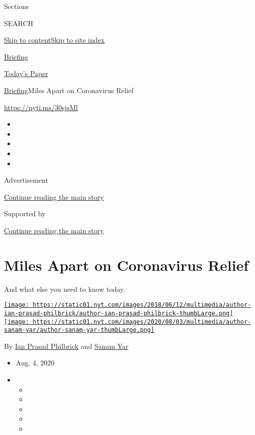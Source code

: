 Sections

SEARCH

\protect\hyperlink{site-content}{Skip to
content}\protect\hyperlink{site-index}{Skip to site index}

\href{https://www.nytimes.com/interactive/2018/briefing/global-morning-briefing-newsletter-signup.html}{Briefing}

\href{https://myaccount.nytimes.com/auth/login?response_type=cookie\&client_id=vi}{}

\href{https://www.nytimes.com/section/todayspaper}{Today's Paper}

\href{/interactive/2018/briefing/global-morning-briefing-newsletter-signup.html}{Briefing}\textbar{}Miles
Apart on Coronavirus Relief

\url{https://nyti.ms/30sjsMl}

\begin{itemize}
\item
\item
\item
\item
\item
\end{itemize}

Advertisement

\protect\hyperlink{after-top}{Continue reading the main story}

Supported by

\protect\hyperlink{after-sponsor}{Continue reading the main story}

\hypertarget{miles-apart-on-coronavirus-relief}{%
\section{Miles Apart on Coronavirus
Relief}\label{miles-apart-on-coronavirus-relief}}

And what else you need to know today.

\href{https://www.nytimes.com/by/ian-prasad-philbrick}{\texttt{[image: https://static01.nyt.com/images/2018/06/12/multimedia/author-ian-prasad-philbrick/author-ian-prasad-philbrick-thumbLarge.png]}}\href{https://www.nytimes.com/by/sanam-yar}{\texttt{[image: https://static01.nyt.com/images/2020/08/03/multimedia/author-sanam-yar/author-sanam-yar-thumbLarge.png]}}

By \href{https://www.nytimes.com/by/ian-prasad-philbrick}{Ian Prasad
Philbrick} and \href{https://www.nytimes.com/by/sanam-yar}{Sanam Yar}

\begin{itemize}
\item
  Aug. 4, 2020
\item
  \begin{itemize}
  \item
  \item
  \item
  \item
  \item
  \end{itemize}
\end{itemize}

